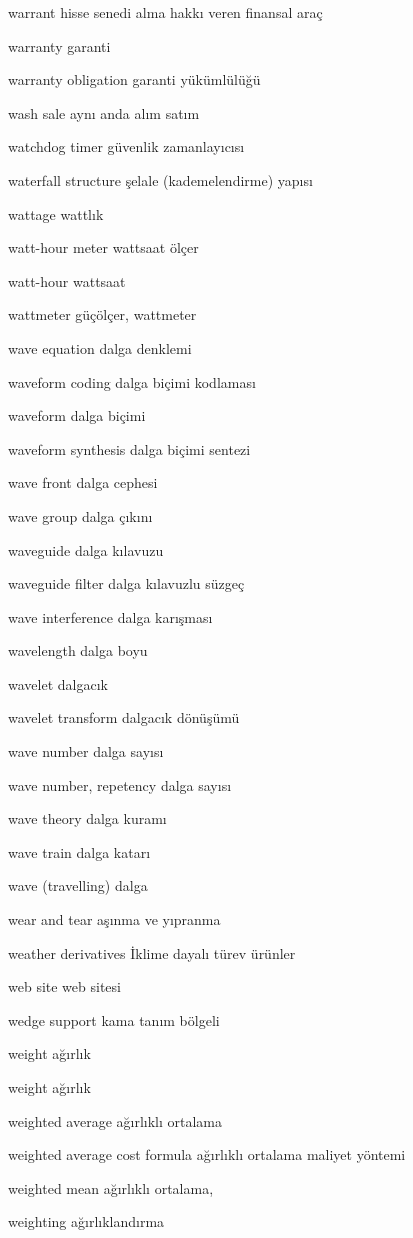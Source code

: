 \documentclass[12pt,fleqn]{article}\usepackage{../../common}
\begin{document}
warrant hisse senedi alma hakkı veren finansal araç

warranty garanti

warranty obligation garanti yükümlülüğü

wash sale aynı anda alım satım

watchdog timer güvenlik zamanlayıcısı

waterfall structure şelale (kademelendirme) yapısı

wattage wattlık

watt-hour meter wattsaat ölçer

watt-hour wattsaat

wattmeter güçölçer, wattmeter

wave equation dalga denklemi

waveform coding dalga biçimi kodlaması

waveform dalga biçimi

waveform synthesis dalga biçimi sentezi

wave front dalga cephesi

wave group dalga çıkını

waveguide dalga kılavuzu

waveguide filter dalga kılavuzlu süzgeç

wave interference dalga karışması

wavelength dalga boyu

wavelet dalgacık

wavelet transform dalgacık dönüşümü

wave number dalga sayısı

wave number, repetency dalga sayısı

wave theory dalga kuramı

wave train dalga katarı

wave (travelling) dalga

wear and tear aşınma ve yıpranma

weather derivatives İklime dayalı türev ürünler

web site web sitesi

wedge support kama tanım bölgeli

weight ağırlık

weight ağırlık

weighted average ağırlıklı ortalama

weighted average cost formula ağırlıklı ortalama maliyet yöntemi

weighted mean ağırlıklı ortalama,

weighting ağırlıklandırma
\end{document}
